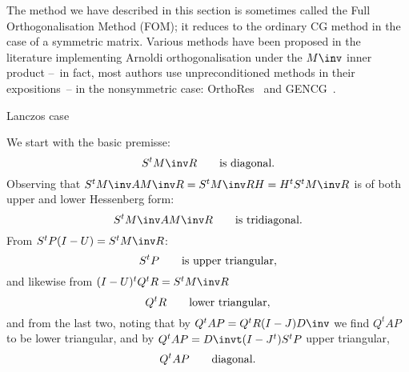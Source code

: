 \documentclass[11pt]{artikel3}
\begin{document}
\begin{Outline}
The method we have described in this section is sometimes called the
Full Orthogonalisation Method (FOM); it reduces to the ordinary
CG method in the case of a symmetric matrix. Various methods have been
proposed in the literature implementing Arnoldi orthogonalisation
under the $M\inv$ inner product --~in fact, most authors use
unpreconditioned methods in their expositions~-- in the nonsymmetric
case: OrthoRes~\cite{YoungJea1980:generalizedcg} and
GENCG~\cite{CoGo:cgnonsymmetric,Wi:nonsymm}.

 {Lanczos case}

We start with the basic premisse:
\[ S^tM\inv R\qquad\hbox{is diagonal}. \]
Observing that $S^tM\inv AM\inv R=S^tM\inv RH=H^tS^tM\inv R$
is of both upper and lower Hessenberg form:
\[ S^tM\inv AM\inv R\qquad\hbox{is tridiagonal}. \]
From $S^tP(I-U)=S^tM\inv R$:
\[ S^tP\qquad\hbox{is upper triangular}, \]
and likewise from $(I-U)^tQ^tR=S^tM\inv R$
\[ Q^tR\qquad\hbox{lower triangular}, \]
and from the last two, noting that by
$Q^tAP=Q^tR(I-J)D\inv$ we find $Q^tAP$ to be lower triangular,
and by $Q^tAP=D\invt(I-J^t)S^tP$ upper triangular,
\[ Q^tAP\qquad\hbox{diagonal}. \]

\begin{comment}
Here are a few more.
\begin{table}[htb]
\begin{tabular}{rlll}
 Equation\hfill/\hfill Shape&Relation&Valid for\\
 \hline
 $S^tAP=S^tR(I-J)D^{-1}$\hfill\hbox{} \\
 lower bidiagonal& $s_i^tAp_j=0$& $j>i$, $i>j+1$\\
 $Q^tAR=D^{-1}(I-J)^tS^tR$\hfill\hbox{} \\
 upper bidiagonal& $q_i^tAr_j=0$& $i>j$, $j>i+1$\\
 $S^tAP=(I-U)^tQ^tAP$\hfill\hbox{}& $s_i^tAp_i=q_i^tAp_i$\\
 $Q^tAR=Q^tAP(I-U)$\hfill\hbox{}& $q_i^tAr_i=q_i^tAp_i$
\end{tabular}
\caption{Orthogonality properties of the Lanczos
method.}
\label{ortholan:table}
\end{table}
\end{comment}
 
\begin{comment}
For completeness,
table~\ref{ortho:table} gives orthogonality properties for the
gradients and search directions thus derived.


\end{comment}
\end{Outline}
\end{document}
